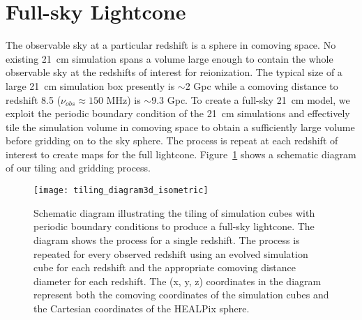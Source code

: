 \documentclass[fleqn,usenatbib]{mnras}
\begin{document}


\appendix

\section{Full-sky Lightcone}
\label{apd:lightcone}
The observable sky at a particular redshift is a sphere in comoving space.  No existing 21~cm simulation spans a volume large enough to contain the whole observable sky at the redshifts of interest for reionization. The typical size of a large 21~cm simulation box presently is $\sim$2 Gpc while a comoving distance to redshift 8.5 ($\nu_{obs}\approx150$ MHz) is $\sim$9.3 Gpc.  To create a full-sky 21~cm model, we exploit the periodic boundary condition of the 21~cm simulations and effectively tile the simulation volume in comoving space to obtain a sufficiently large volume before gridding on to the sky sphere.  The process is repeat at each redshift of interest to create maps for the full lightcone.   Figure~\ref{fig:tiling_scheme} shows a schematic diagram of our tiling and gridding process.

\begin{figure}
    \texttt{[image: tiling\_diagram3d\_isometric]}
    \caption{Schematic diagram illustrating the tiling of simulation cubes with periodic boundary conditions to produce a full-sky lightcone. The diagram shows the process for a single redshift. The process is repeated for every observed redshift using an evolved simulation cube for each redshift and the appropriate comoving distance diameter for each redshift. The (x, y, z) coordinates in the diagram represent both the comoving coordinates of the simulation cubes and the Cartesian coordinates of the HEALPix sphere.}
    \label{fig:tiling_scheme}
\end{figure}
\end{document}
